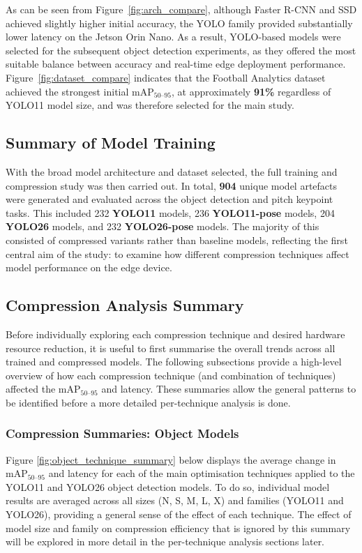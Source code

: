 As can be seen from Figure~\ref{fig:arch_compare}, although Faster R-CNN \cite{7485869} and SSD achieved slightly higher initial accuracy, the YOLO family \cite{UltralyticsYOLO} provided substantially lower latency on the Jetson Orin Nano. As a result, YOLO-based models were selected for the subsequent object detection experiments, as they offered the most suitable balance between accuracy and real-time edge deployment performance. Figure~\ref{fig:dataset_compare} indicates that the Football Analytics dataset achieved the strongest initial $\mathrm{mAP}_{50\text{--}95}$, at approximately \textbf{91\%} regardless of YOLO11 model size, and was therefore selected for the main study.



\subsection{Summary of Model Training}



With the broad model architecture and dataset selected, the full training and compression study was then carried out. In total, \textbf{904} unique model artefacts were generated and evaluated across the object detection and pitch keypoint tasks. This included 232 \textbf{YOLO11} models, 236 \textbf{YOLO11-pose} models, 204 \textbf{YOLO26} models, and 232 \textbf{YOLO26-pose} models. The majority of this consisted of compressed variants rather than baseline models, reflecting the first central aim of the study: to examine how different compression techniques affect model performance on the edge device. 

\subsection{Compression Analysis Summary}
Before individually exploring each compression technique and desired hardware resource reduction, it is useful to first summarise the overall trends across all trained and compressed models. The following subsections provide a high-level overview of how each compression technique (and combination of techniques) affected the mAP$_{50\text{--}95}$ and latency. These summaries allow the general patterns to be identified before a more detailed per-technique analysis is done.

\subsubsection{Compression Summaries: Object Models}
Figure \ref{fig:object_technique_summary} below displays the average change in mAP$_{50\text{--}95}$ and latency for each of the main optimisation techniques applied to the YOLO11 and YOLO26 object detection models. To do so, individual model results are averaged across all sizes (N, S, M, L, X) and families (YOLO11 and YOLO26), providing a general sense of the effect of each technique. The effect of model size and family on compression efficiency that is ignored by this summary will be explored in more detail in the per-technique analysis sections later.

